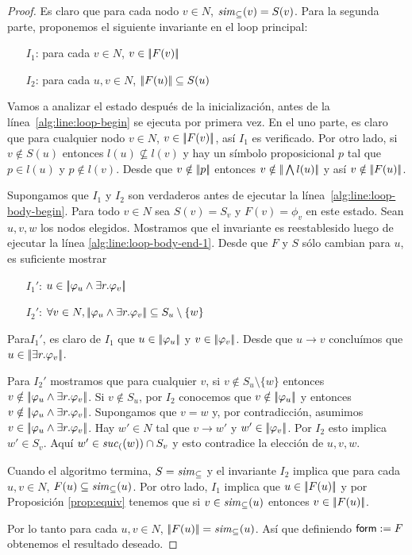 \iffullversion
\begin{proof}
Es claro que para cada nodo $v\in N$,
${\it sim}_\subseteq(v)=S(v)$. Para la segunda parte, proponemos el siguiente invariante en el loop principal:
\begin{itemize}
\item[$I_1$:] para cada $v\in N$, $v \in |\!|F(v)|\!|$
\item[$I_2$:] para cada $u,v\in N$, $|\!|F(u)|\!| \subseteq S(u)$
\end{itemize}

Vamos a analizar el estado despu\'es de la inicializaci\'on, antes de la l\'inea~\ref{alg:line:loop-begin} se ejecuta por primera vez. En el uno
parte, es claro que para cualquier nodo $v\in N$, $v \in |\!|F(v)|\!|$, as\'i
$I_1$ es verificado. Por otro lado, si $v\notin S(u)$ entonces
$l(u)\not\subseteq l(v)$ y hay un s\'imbolo proposicional $p$ tal que $p \in l(u)$ y $p \notin l(v)$. Desde que $v\notin|\!|p|\!|$
entonces $v\notin|\!|\bigwedge l(u)|\!|$ y as\'i
$v\notin |\!|F(u)|\!|$.

Supongamos que $I_1$ y $I_2$ son verdaderos antes de ejecutar la 
l\'inea~\ref{alg:line:loop-body-begin}. Para todo $v\in N$ sea $S(v)=S_v$ y
$F(v)=\phi_v$ en este estado. Sean $u,v,w$ los nodos elegidos. Mostramos que el invariante es reestablesido luego de ejecutar la l\'inea
\ref{alg:line:loop-body-end-1}. Desde que $F$ y $S$ s\'olo cambian para $u$, 
es suficiente mostrar
\begin{itemize}
\item[$I_1'$:] $u \in |\!|\varphi_u\wedge\exists r. \varphi_v|\!|$
\item[$I_2'$:] $\forall v\in N, |\!|\varphi_u\wedge\exists r. \varphi_v|\!| \subseteq S_u\setminus\{w\}$
\end{itemize}
Para$I_1'$, es claro de $I_1$ que $u \in |\!|\varphi_u|\!|$ y $v \in |\!|\varphi_v|\!|$. Desde que $u\to v$ conclu\'imos que $u \in |\!|\exists r.
\varphi_v|\!|$.

Para $I_2'$ mostramos que para cualquier $v$, si $v\notin S_u\setminus\{w\}$
entonces $v\notin |\!|\varphi_u\wedge\exists r. \varphi_v|\!|$. Si $v\notin S_u$,
por $I_2$ conocemos que $v\notin |\!|\varphi_u|\!|$ y entonces $v\notin
|\!|\varphi_u\wedge\exists r. \varphi_v|\!|$. Supongamos que $v=w$ y, por
contradicci\'on, asumimos $v \in |\!|\varphi_u\wedge\exists r. \varphi_v|\!|$.
Hay $w'\in N$ tal que $v\to w'$ y $w' \in
|\!|\varphi_v|\!|$. Por $I_2$ esto implica $w'\in S_v$. Aqu\'i $w'\in{\it suc}_{(}(w))\cap S_v$ y esto contradice la elecci\'on de $u,v,w$.

Cuando el algoritmo termina, $S={\it sim}_\subseteq$ y
el invariante $I_2$ implica que para cada $u,v\in N$,
$F(u) \subseteq {\it sim}_\subseteq(u)$. Por otro lado, $I_1$
implica que $u \in |\!|F(u)|\!|$ y por Proposici\'on \ref{prop:equiv} tenemos que si
 $v\in {\it sim}_\subseteq(u)$ entonces $v \in |\!|F(u)|\!|$.

Por lo tanto para cada $u,v\in N$, $|\!|F(u)|\!| = {\it sim}_\subseteq(u)$. 
As\'i que definiendo $\mathsf{form}:=F$ obtenemos el resultado deseado.
\end{proof}
\else
\fi

